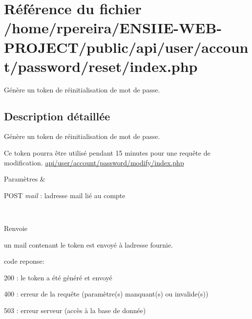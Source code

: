 \hypertarget{user_2account_2password_2reset_2index_8php}{}\section{Référence du fichier /home/rpereira/\+E\+N\+S\+I\+I\+E-\/\+W\+E\+B-\/\+P\+R\+O\+J\+E\+C\+T/public/api/user/account/password/reset/index.php}
\label{user_2account_2password_2reset_2index_8php}


Génère un token de réinitialisation de mot de passe.  




\subsection{Description détaillée}
Génère un token de réinitialisation de mot de passe. 

Ce token pourra être utilisé pendant 15 minutes pour une requête de modification. \hyperlink{user_2account_2password_2modify_2index_8php}{api/user/account/password/modify/index.\+php} 
\begin{DoxyParams}{Paramètres}
{\em } & 
\begin{DoxyItemize}
\item P\+O\+ST {\itshape mail} \+: l\textquotesingle{}adresse mail lié au compte 
\end{DoxyItemize}\\
\hline
\end{DoxyParams}
\begin{DoxyReturn}{Renvoie}

\begin{DoxyItemize}
\item un mail contenant le token est envoyé à l\textquotesingle{}adresse fournie.
\item code reponse\+:
\begin{DoxyItemize}
\item 200 \+: le token a été généré et envoyé
\item 400 \+: erreur de la requête (paramètre(s) manquant(s) ou invalide(s))
\item 503 \+: erreur serveur (accès à la base de donnée) 
\end{DoxyItemize}
\end{DoxyItemize}
\end{DoxyReturn}
